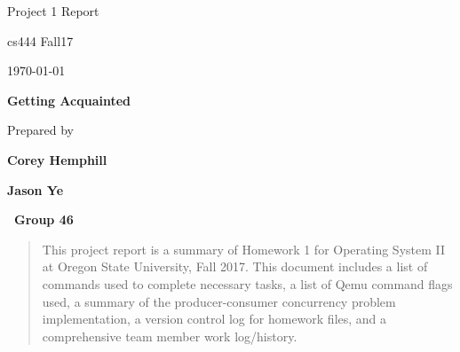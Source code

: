 \documentclass[onecolumn, draftclsnofoot,10pt, compsoc]{IEEEtran}
\def \OperatingSystemTwo{Group 46}
\def \GroupMemberOne{Corey Hemphill}
\def \GroupMemberTwo{Jason Ye}
\def \HomeworkAssignmentOne{Getting Acquainted}
\def \DocType{	%
				Project 1 Report
				}
\begin{document}
\begin{titlepage}
    \begin{singlespace}
        \hfill 
        \par\vspace{.2in}
        \centering
        \scshape{
            \huge  \DocType \par
           	\huge cs444 Fall17 \par
            {\large\today}\par
            \vspace{.5in}
            \textbf{\Huge\HomeworkAssignmentOne}\par
            \vspace{.5in}
           
            {\large Prepared by }\par
           	\textbf{\GroupMemberOne}\par
            \textbf{\GroupMemberTwo}\par
   
            \vspace{5pt}
            
            \textbf{\Huge\ \OperatingSystemTwo}\par
            }
            \vspace{60pt}
        
        \begin{abstract}
        This project report is a summary of Homework 1 for Operating System II at Oregon State University, Fall 2017. This document includes a list of commands used to complete necessary tasks, a list of Qemu command flags used, a summary of the producer-consumer concurrency problem implementation, a version control log for homework files, and a comprehensive team member work log/history.
        \end{abstract} 
        
    \end{singlespace}
\end{titlepage}
\newpage
{}
\tableofcontents
\clearpage
\end{document}
